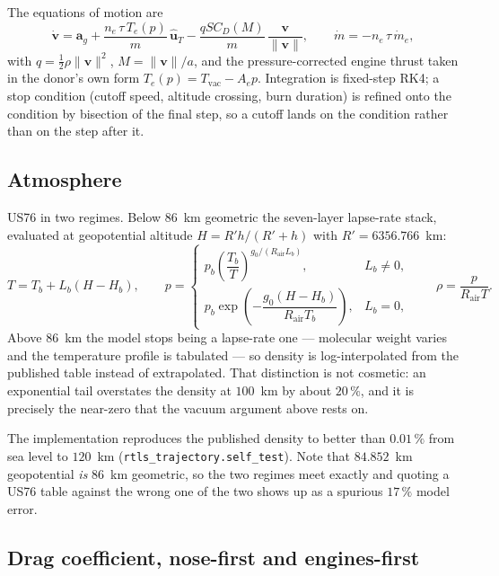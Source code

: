 \documentclass[11pt,a4paper]{article}
\newcommand{\vect}[1]{\mathbf{#1}}
\newcommand{\code}[1]{\texttt{#1}}
\begin{document}
The equations of motion are
\begin{equation}
\dot{\vect{v}} = \vect{a}_g
  + \frac{n_e\,\tau\,T_e(p)}{m}\,\hat{\vect{u}}_T
  - \frac{q S C_D(M)}{m}\,\frac{\vect{v}}{\lVert\vect{v}\rVert},
\qquad
\dot m = -n_e\,\tau\,\dot m_e ,
\end{equation}
with $q=\tfrac12\rho\lVert\vect{v}\rVert^2$, $M=\lVert\vect{v}\rVert/a$, and the
pressure-corrected engine thrust taken in the donor's own form
$T_e(p)=T_{\mathrm{vac}}-A_e p$. Integration is fixed-step RK4; a stop condition
(cutoff speed, altitude crossing, burn duration) is refined onto the condition by
bisection of the final step, so a cutoff lands on the condition rather than on
the step after it.

\subsection{Atmosphere}

US76 in two regimes. Below $86$~km geometric the seven-layer lapse-rate stack,
evaluated at geopotential altitude $H = R' h/(R'+h)$ with $R'=6356.766$~km:
\begin{equation}
T = T_b + L_b (H - H_b),
\qquad
p = \begin{cases}
p_b\left(\dfrac{T_b}{T}\right)^{g_0/(R_{\mathrm{air}}L_b)}, & L_b \neq 0,\\[2ex]
p_b\exp\!\left(-\dfrac{g_0 (H-H_b)}{R_{\mathrm{air}}T_b}\right), & L_b = 0,
\end{cases}
\qquad \rho = \frac{p}{R_{\mathrm{air}}T}.
\end{equation}
Above $86$~km the model stops being a lapse-rate one --- molecular weight varies
and the temperature profile is tabulated --- so density is log-interpolated from
the published table instead of extrapolated. That distinction is not cosmetic: an
exponential tail overstates the density at $100$~km by about $20\,\%$, and it is
precisely the near-zero that the vacuum argument above rests on.

The implementation reproduces the published density to better than $0.01\,\%$
from sea level to $120$~km (\code{rtls\_trajectory.self\_test}). Note that
$84.852$~km geopotential \emph{is} $86$~km geometric, so the two regimes meet
exactly and quoting a US76 table against the wrong one of the two shows up as a
spurious $17\,\%$ model error.

\subsection{Drag coefficient, nose-first and engines-first}
\label{subsec:cds}
\end{document}
